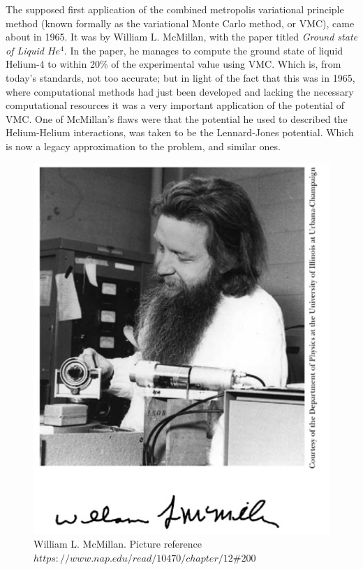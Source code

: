 \documentclass[aip,nobalancelastpage,
twocolumn,
rsi,%
 amsmath,amssymb,
 reprint,%
]{revtex4}
\begin{document}
The supposed first application of the combined metropolis variational principle method (known formally as the variational Monte Carlo method, or VMC), came about in 1965. It was by William L. McMillan, with the paper titled \textit{Ground state of Liquid $He^4$}. In the paper, he manages to compute the ground state of liquid Helium-4 to within 20\% of the experimental value\cite{McMillanPaper} using VMC. Which is, from today's standards, not too accurate; but in light of the fact that this was in 1965, where computational methods had just been developed and lacking the necessary computational resources it was a very important application of the potential of VMC. One of McMillan's flaws were that the potential he used to described the Helium-Helium interactions, was taken to be the Lennard-Jones potential. Which is now a legacy approximation to the problem, and similar ones. \par

\begin{figure}[H]
\center
\includegraphics[scale=0.3]{mcmillan.png}
\caption{William L. McMillan. Picture reference \textit{$https://www.nap.edu/read/10470/chapter/12\#200$}}
\end{figure}
\end{document}
